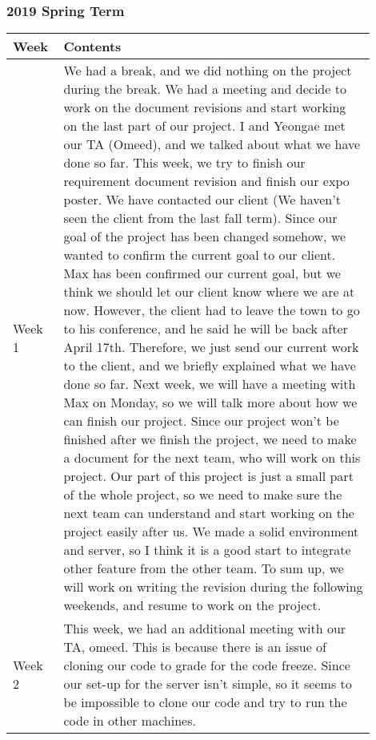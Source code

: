 \documentclass[10pt]{article}
\begin{document}
        \subsubsection{2019 Spring Term}
            \begin{center}
            \begin{tabular}{ | p{0.1\linewidth} | p{0.8\linewidth} | } \hline
                Week & Contents  \\ \hline
                Week 1 & We had a break, and we did nothing on the project during the break.
                We had a meeting and decide to work on the document revisions and start working on the last part of our project.
                I and Yeongae met our TA (Omeed), and we talked about what we have done so far.
                This week, we try to finish our requirement document revision and finish our expo poster.
                We have contacted our client (We haven't seen the client from the last fall term).
                Since our goal of the project has been changed somehow, we wanted to confirm the current goal to our client.
                Max has been confirmed our current goal, but we think we should let our client know where we are at now.
                However, the client had to leave the town to go to his conference, and he said he will be back after April 17th.
                Therefore, we just send our current work to the client, and we briefly explained what we have done so far.
                Next week, we will have a meeting with Max on Monday, so we will talk more about how we can finish our project.
                Since our project won't be finished after we finish the project, we need to make a document for the next team, who will work on this project.
                Our part of this project is just a small part of the whole project, so we need to make sure the next team can understand and start working on the project easily after us.
                We made a solid environment and server, so I think it is a good start to integrate other feature from the other team.
                To sum up, we will work on writing the revision during the following weekends, and resume to work on the project.
                   \\ \hline
                Week 2 & This week, we had an additional meeting with our TA, omeed.
                This is because there is an issue of cloning our code to grade for the code freeze.
                Since our set-up for the server isn't simple, so it seems to be impossible to clone our code and try to run the code in other machines.

\end{tabular}
\end{center}
\end{document}
